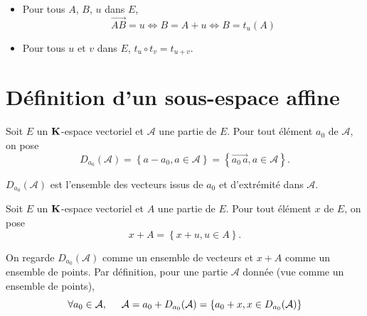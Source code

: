 \begin{rems}
  \begin{itemize}
    \item Pour tous $A$, $B$, $u$ dans $E$, 
\begin{displaymath}
  \overrightarrow{AB} = u \Leftrightarrow B = A + u \Leftrightarrow B = t_u(A)
\end{displaymath}
    \item Pour tous $u$ et $v$ dans $E$, $t_u \circ t_v = t_{u+v}$.
  \end{itemize}
\end{rems}


\section{Définition d'un sous-espace affine}
\begin{defi}
 Soit $E$ un $\mathbf{K}$-espace vectoriel et $\mathcal A$ une partie de $E$. Pour tout élément $a_0$ de $\mathcal A$, on pose
\begin{displaymath}
 D_{a_0}(\mathcal{A}) = \left\lbrace a- a_0, a\in \mathcal A\right\rbrace = \left\lbrace \overrightarrow{a_0\, a}, a\in \mathcal A\right\rbrace  .
\end{displaymath}
\end{defi}
\begin{rem}
 $D_{a_0}(\mathcal{A})$ est l'ensemble des vecteurs issus de $a_0$ et d'extrémité dans $\mathcal{A}$.
\end{rem}

\begin{defi}
 Soit $E$ un $\mathbf{K}$-espace vectoriel et $A$ une partie de $E$. Pour tout élément $x$ de $E$, on pose
\begin{displaymath}
 x+A = \left\lbrace x+u, u\in A\right\rbrace .
\end{displaymath}
\end{defi}
\begin{rem}
 On regarde $D_{a_0}(\mathcal{A})$ comme un ensemble de vecteurs et $x + A$ comme un ensemble de points. Par définition, pour une partie $\mathcal{A}$ donnée (vue comme un ensemble de points),
\begin{displaymath}
\forall a_0\in \mathcal{A}, \hspace{0.5cm} \mathcal A = a_0 + D_{a_0}(\mathcal{A})=\left\lbrace  a_0 + x, x\in D_{a_0}(\mathcal{A})\right\rbrace 
\end{displaymath}
\end{rem}

